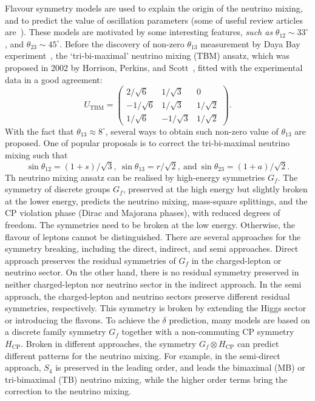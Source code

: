 \documentclass[a4paper,11pt]{article}
\begin{document}
Flavour symmetry models are used to explain the origin of the neutrino mixing, and to predict the value of oscillation parameters (some of useful review articles are~\cite{Altarelli:2010gt,Ishimori:2010au,King:2013eh,King:2014nza,King:2015aea,King:2015ata,King:2017guk}). These models are motivated by some interesting features, \textit{such as} $\theta_{12}\sim 33^\circ$, and $\theta_{23}\sim 45^\circ$. Before the discovery of non-zero $\theta_{13}$ measurement by Daya Bay experiment~\cite{An:2013zwz}, the `tri-bi-maximal' neutrino mixing (TBM) ansatz, which was proposed in 2002 by Horrison, Perkins, and Scott~\cite{Harrison:2002er}, fitted with the experimental data in a good agreement:
\begin{equation*}
U_{\text{TBM}}=\left(
\begin{array}{ccc}
2/\sqrt{6} & 1/\sqrt{3} & 0\\
-1/\sqrt{6} & 1/\sqrt{3} & 1/\sqrt{2}\\
1/\sqrt{6}  & -1/\sqrt{3} & 1/\sqrt{2}
\end{array}\right).
\end{equation*} 
With the fact that $\theta_{13}\approx 8^\circ$, several ways to obtain such non-zero value of $\theta_{13}$ are proposed. One of popular proposals is to correct the tri-bi-maximal neutrino mixing such that 
\begin{equation*}
\sin\theta_{12}=(1+s)/\sqrt{3},~\sin\theta_{13}=r/\sqrt{2},~\text{and}~\sin\theta_{23}=(1+a)/\sqrt{2}.
\end{equation*}
Th neutrino mixing ansatz can be realised by high-energy symmetries $G_f$.
The symmetry of discrete groups $G_f$, preserved at the high energy but slightly broken at the lower energy, predicts the neutrino mixing, mass-square splittings, and the CP violation phase (Dirac and Majorana phases), with reduced degrees of freedom. 
The symmetries need to be broken at the low energy. Otherwise, the flavour of leptons cannot be distinguished. There are several approaches for the symmetry breaking, including the direct, indirect, and semi approaches. Direct approach preserves the residual symmetries of $G_f$ in the charged-lepton or neutrino sector. On the other hand, there is no residual symmetry preserved in neither charged-lepton nor neutrino sector in the indirect approach. In the semi approach, the charged-lepton and neutrino sectors preserve different residual symmetries, respectively. This symmetry is broken by extending the Higgs sector or introducing the flavons.
%
To achieve the $\delta$ prediction, many models are based on a discrete family symmetry $G_f$ together with a non-commuting CP symmetry $H_\mathrm{CP}$. Broken in different approaches, the symmetry $G_f\otimes H_\mathrm{CP}$ can predict different patterns for the neutrino mixing. For example, in the semi-direct approach, $S_4$ is preserved in the leading order, and leads the bimaximal (MB) or tri-bimaximal (TB) neutrino mixing, while the higher order terms bring the correction to the neutrino mixing.
\end{document}
